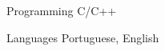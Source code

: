 

\begin{cvskills}

  \cvskill
    {Programming} %
    {C/C++} %


  \cvskill
    {Languages} %
    {Portuguese, English} %


\end{cvskills}
